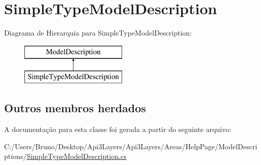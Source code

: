 \hypertarget{classApi3Layers_1_1Areas_1_1HelpPage_1_1ModelDescriptions_1_1SimpleTypeModelDescription}{}\section{Simple\+Type\+Model\+Description}
\label{classApi3Layers_1_1Areas_1_1HelpPage_1_1ModelDescriptions_1_1SimpleTypeModelDescription}
Diagrama de Hierarquia para Simple\+Type\+Model\+Description\+:\begin{figure}[H]
\begin{center}
\leavevmode
\includegraphics[height=2.000000cm]{dc/d0b/classApi3Layers_1_1Areas_1_1HelpPage_1_1ModelDescriptions_1_1SimpleTypeModelDescription}
\end{center}
\end{figure}
\subsection*{Outros membros herdados}


A documentação para esta classe foi gerada a partir do seguinte arquivo\+:\begin{DoxyCompactItemize}
\item 
C\+:/\+Users/\+Bruno/\+Desktop/\+Api3\+Layers/\+Api3\+Layers/\+Areas/\+Help\+Page/\+Model\+Descriptions/\hyperlink{SimpleTypeModelDescription_8cs}{Simple\+Type\+Model\+Description.\+cs}\end{DoxyCompactItemize}
